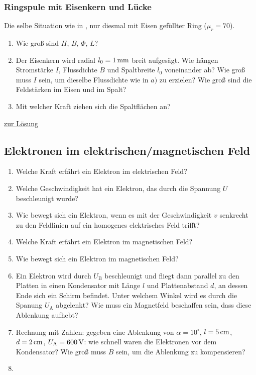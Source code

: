 \documentclass[a4paper]{scrartcl}
\begin{document}
\subsubsection{Ringspule mit Eisenkern und Lücke}
\label{aufg:RingspuleMit}
Die selbe Situation wie in , nur diesmal mit Eisen gefüllter Ring ($\mu_r = 70$).
\begin{enumerate}[noitemsep]
  \item Wie groß sind $H$, $B$, $\Phi$, $L$?
  \item Der Eisenkern wird radial $l_0 = \unit[1]{mm}$ breit aufgesägt. Wie hängen Stromstärke $I$, Flussdichte $B$ und Spaltbreite $l_0$ voneinander ab? Wie groß muss $I$ sein, um dieselbe Flussdichte wie in $a)$ zu erzielen? Wie groß sind die Feldstärken im Eisen und im Spalt?
  \item Mit welcher Kraft ziehen sich die Spaltflächen an?
\end{enumerate}

\hyperref[lsg:RingspuleMit]{zur Lösung}

\subsection{Elektronen im elektrischen/magnetischen Feld}
\label{aufg:ElektronEB}
\begin{enumerate}[noitemsep]
  \item Welche Kraft erfährt ein Elektron im elektrischen Feld?
  \item Welche Geschwindigkeit hat ein Elektron, das durch die Spannung $U$ beschleunigt wurde?
  \item Wie bewegt sich ein Elektron, wenn es mit der Geschwindigkeit $v$ senkrecht zu den Feldlinien auf ein homogenes elektrisches Feld trifft?
  \item Welche Kraft erfährt ein Elektron im magnetischen Feld?
  \item Wie bewegt sich ein Elektron im magnetischen Feld?
  \item Ein Elektron wird durch $U_\text{B}$ beschleunigt und fliegt dann parallel zu den Platten in einen Kondensator mit Länge $l$ und Plattenabstand $d$, an dessen Ende sich ein Schirm befindet. Unter welchem Winkel wird es durch die Spanung $U_\text{A}$ abgelenkt? Wie muss ein Magnetfeld beschaffen sein, dass diese Ablenkung aufhebt?
  \item Rechnung mit Zahlen: gegeben eine Ablenkung von $\alpha = 10^\circ$, $l = \unit[5]{cm}$, $d=\unit[2]{cm}$, $U_\text{A} = \unit[600]{V}$: wie schnell waren die Elektronen vor dem Kondensator? Wie groß muss $B$ sein, um die Ablenkung zu kompensieren?
  \item {}

\end{enumerate}
\end{document}
